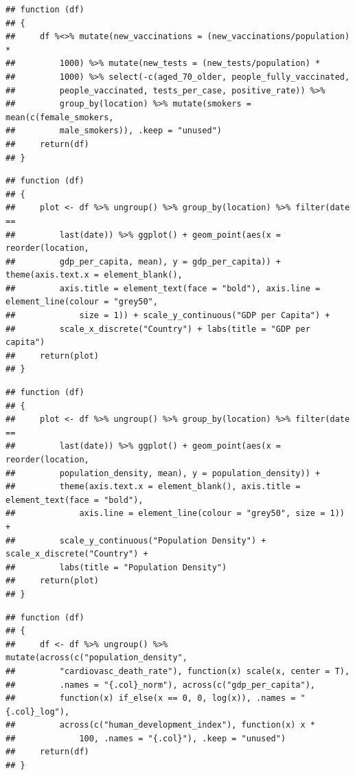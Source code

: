 \documentclass[11pt,preprint, authoryear]{elsarticle}
\numberwithin{equation}{section}
\numberwithin{figure}{section}
\numberwithin{table}{section}
\begin{document}
\begin{verbatim}
## function (df) 
## {
##     df %<>% mutate(new_vaccinations = (new_vaccinations/population) * 
##         1000) %>% mutate(new_tests = (new_tests/population) * 
##         1000) %>% select(-c(aged_70_older, people_fully_vaccinated, 
##         people_vaccinated, tests_per_case, positive_rate)) %>% 
##         group_by(location) %>% mutate(smokers = mean(c(female_smokers, 
##         male_smokers)), .keep = "unused")
##     return(df)
## }
\end{verbatim}

\begin{verbatim}
## function (df) 
## {
##     plot <- df %>% ungroup() %>% group_by(location) %>% filter(date == 
##         last(date)) %>% ggplot() + geom_point(aes(x = reorder(location, 
##         gdp_per_capita, mean), y = gdp_per_capita)) + theme(axis.text.x = element_blank(), 
##         axis.title = element_text(face = "bold"), axis.line = element_line(colour = "grey50", 
##             size = 1)) + scale_y_continuous("GDP per Capita") + 
##         scale_x_discrete("Country") + labs(title = "GDP per capita")
##     return(plot)
## }
\end{verbatim}

\begin{verbatim}
## function (df) 
## {
##     plot <- df %>% ungroup() %>% group_by(location) %>% filter(date == 
##         last(date)) %>% ggplot() + geom_point(aes(x = reorder(location, 
##         population_density, mean), y = population_density)) + 
##         theme(axis.text.x = element_blank(), axis.title = element_text(face = "bold"), 
##             axis.line = element_line(colour = "grey50", size = 1)) + 
##         scale_y_continuous("Population Density") + scale_x_discrete("Country") + 
##         labs(title = "Population Density")
##     return(plot)
## }
\end{verbatim}

\begin{verbatim}
## function (df) 
## {
##     df <- df %>% ungroup() %>% mutate(across(c("population_density", 
##         "cardiovasc_death_rate"), function(x) scale(x, center = T), 
##         .names = "{.col}_norm"), across(c("gdp_per_capita"), 
##         function(x) if_else(x == 0, 0, log(x)), .names = "{.col}_log"), 
##         across(c("human_development_index"), function(x) x * 
##             100, .names = "{.col}"), .keep = "unused")
##     return(df)
## }
\end{verbatim}
\end{document}
